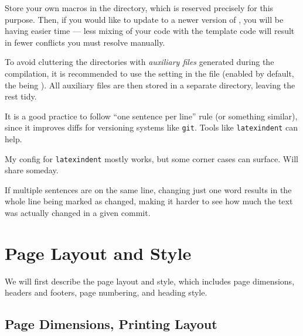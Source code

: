 \begin{remark}
    Store your own macros in the  directory, which is reserved precisely for this purpose.
    Then, if you would like to update to a newer version of \TeXsis{}, you will be having easier time --- less mixing of your code with the template code will result in fewer conflicts you must resolve manually.
\end{remark}

\begin{remark}
    To avoid cluttering the directories with \emph{auxiliary files} generated during the compilation, it is recommended to use the  setting in the  file (enabled by default, the  being ).
    All auxiliary files are then stored in a separate directory, leaving the rest tidy.
\end{remark}

\begin{remark}
    It is a good practice to follow \enquote{one sentence per line} rule (or something similar), since it improves diffs for versioning systems like \texttt{git}.
    Tools like \texttt{latexindent} can help.
    \begin{Note}
        My config for \texttt{latexindent} mostly works, but some corner cases can surface.
        Will share someday.
    \end{Note}
    If multiple sentences are on the same line, changing just one word results in the whole line being marked as changed, making it harder to see how much the text was actually changed in a given commit.
\end{remark}



\section{Page Layout and Style}%
\label{sec:Page Layout}

We will first describe the page layout and style, which includes page dimensions, headers and footers, page numbering, and heading style.

\subsection{Page Dimensions, Printing Layout}%
\label{sub:Page Dimensions}

